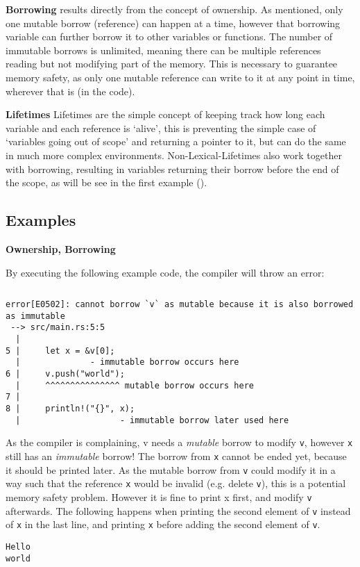 \textbf{Borrowing}\label{sec:borrowing}
results directly from the concept of ownership. As mentioned, only one mutable
borrow (reference) can happen at a time, however that borrowing variable can
further borrow it to other variables or functions. The number of immutable
borrows is unlimited, meaning there can be multiple references reading but not
modifying part of the memory. This is necessary to guarantee memory safety, as
only one mutable reference can write to it at any point in time, wherever that
is (in the code).

\textbf{Lifetimes}\label{sec:lifetimes}
Lifetimes are the simple concept of keeping track how long each variable and
each reference is `alive', this is preventing the simple case of `variables
going out of scope' and returning a pointer to it, but can do the same in much
more complex environments. Non-Lexical-Lifetimes also work together with
borrowing, resulting in variables returning their borrow before the end of the
scope, as will be see in the first example ().

\newpage
\subsection{Examples}\label{sec:examples}

\textbf{Ownership, Borrowing}

By executing the following example code, the compiler will throw an error:
\inputminted[linenos,fontsize=\small]{Rust}{code/code_ownership.rs}


{\small
\begin{verbatim}
error[E0502]: cannot borrow `v` as mutable because it is also borrowed as immutable
 --> src/main.rs:5:5
  |
5 |     let x = &v[0];
  |              - immutable borrow occurs here
6 |     v.push("world");
  |     ^^^^^^^^^^^^^^^ mutable borrow occurs here
7 |
8 |     println!("{}", x);
  |                    - immutable borrow later used here
\end{verbatim}}

As the compiler is complaining, v needs a {\em mutable} borrow to modify
\verb|v|, however \verb|x| still has an {\em immutable} borrow! The borrow from
\verb|x| cannot be ended yet, because it should be printed later. As the mutable
borrow from \verb|v| could modify it in a way such that the reference \verb|x|
would be invalid (e.g. delete \verb|v|), this is a potential memory safety problem.
However it is fine to print x first, and modify \verb|v| afterwards. The
following happens when printing the second element of \verb|v| instead of \verb|x|
in the last line, and printing \verb|x| before adding the second element of \verb|v|.
{\small
\begin{verbatim}
Hello
world
\end{verbatim}}

